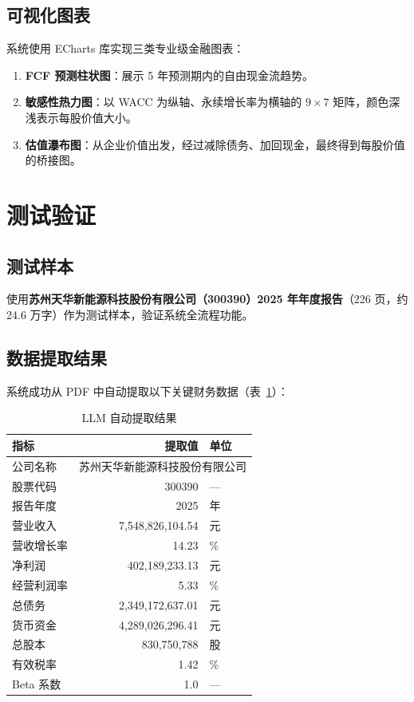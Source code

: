 \documentclass[12pt,a4paper]{article}
\begin{document}
\subsection{可视化图表}

系统使用 ECharts 库实现三类专业级金融图表：

\begin{enumerate}[leftmargin=2em]
  \item \textbf{FCF 预测柱状图}：展示 5 年预测期内的自由现金流趋势。
  \item \textbf{敏感性热力图}：以 WACC 为纵轴、永续增长率为横轴的 $9 \times 7$ 矩阵，颜色深浅表示每股价值大小。
  \item \textbf{估值瀑布图}：从企业价值出发，经过减除债务、加回现金，最终得到每股价值的桥接图。
\end{enumerate}

\section{测试验证}

\subsection{测试样本}

使用\textbf{苏州天华新能源科技股份有限公司（300390）2025 年年度报告}（226 页，约 24.6 万字）作为测试样本，验证系统全流程功能。

\subsection{数据提取结果}

系统成功从 PDF 中自动提取以下关键财务数据（表~\ref{tab:extract}）：

\begin{table}[H]
\centering
\caption{LLM 自动提取结果}
\label{tab:extract}
\begin{tabular}{@{}lrl@{}}
\toprule
\textbf{指标} & \textbf{提取值} & \textbf{单位} \\
\midrule
公司名称       & \multicolumn{2}{l}{苏州天华新能源科技股份有限公司} \\
股票代码       & 300390              & --- \\
报告年度       & 2025                & 年 \\
营业收入       & 7,548,826,104.54    & 元 \\
营收增长率     & 14.23               & \% \\
净利润         & 402,189,233.13      & 元 \\
经营利润率     & 5.33                & \% \\
总债务         & 2,349,172,637.01    & 元 \\
货币资金       & 4,289,026,296.41    & 元 \\
总股本         & 830,750,788         & 股 \\
有效税率       & 1.42                & \% \\
Beta 系数      & 1.0                 & --- \\
\bottomrule
\end{tabular}
\end{table}
\end{document}
